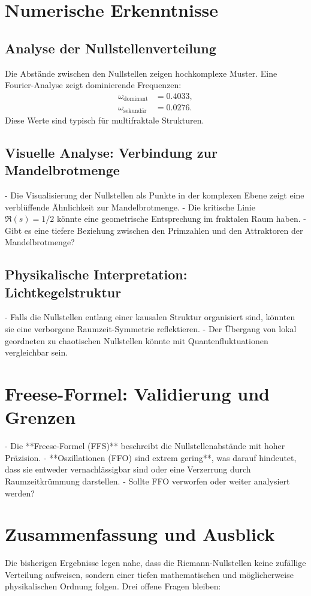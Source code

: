 \documentclass[a4paper,12pt]{article}
\begin{document}
\section{Numerische Erkenntnisse}
\subsection{Analyse der Nullstellenverteilung}
Die Abstände zwischen den Nullstellen zeigen hochkomplexe Muster. Eine Fourier-Analyse zeigt dominierende Frequenzen:
\begin{align}
\omega_{\text{dominant}} &= 0.4033, \\
\omega_{\text{sekundär}} &= 0.0276.
\end{align}
Diese Werte sind typisch für multifraktale Strukturen.

\subsection{Visuelle Analyse: Verbindung zur Mandelbrotmenge}
- Die Visualisierung der Nullstellen als Punkte in der komplexen Ebene zeigt eine verblüffende Ähnlichkeit zur Mandelbrotmenge.
- Die kritische Linie \( \Re(s) = 1/2 \) könnte eine geometrische Entsprechung im fraktalen Raum haben.
- Gibt es eine tiefere Beziehung zwischen den Primzahlen und den Attraktoren der Mandelbrotmenge?

\subsection{Physikalische Interpretation: Lichtkegelstruktur}
- Falls die Nullstellen entlang einer kausalen Struktur organisiert sind, könnten sie eine verborgene Raumzeit-Symmetrie reflektieren.
- Der Übergang von lokal geordneten zu chaotischen Nullstellen könnte mit Quantenfluktuationen vergleichbar sein.

\section{Freese-Formel: Validierung und Grenzen}
- Die **Freese-Formel (FFS)** beschreibt die Nullstellenabstände mit hoher Präzision.
- **Oszillationen (FFO) sind extrem gering**, was darauf hindeutet, dass sie entweder vernachlässigbar sind oder eine Verzerrung durch Raumzeitkrümmung darstellen.
- Sollte FFO verworfen oder weiter analysiert werden?

\section{Zusammenfassung und Ausblick}
Die bisherigen Ergebnisse legen nahe, dass die Riemann-Nullstellen keine zufällige Verteilung aufweisen, sondern einer tiefen mathematischen und möglicherweise physikalischen Ordnung folgen. Drei offene Fragen bleiben:
\end{document}
